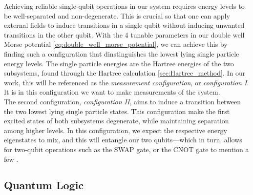 \documentclass{subfiles}
\begin{document}
Achieving reliable single-qubit operations in our system requires energy levels to be well-separated and non-degenerate. This is crucial so that one can apply external fields to induce transitions in a single qubit without inducing unwanted transitions in the other qubit. With the 4 tunable parameters in our double well Morse potential \eqref{eq:double_well_morse_potential}, we can achieve this by finding such a configuration that dinstinguishes the lowest lying single particle energy levels. The single particle energies are the Hartree energies of the two subsystems, found through the Hartree calculation \ref{sec:Hartree_method}. In our work, this will be referenced as the \emph{measurement configuration}, or \emph{configuration I}. It is in this configuration we want to make measurements of the system. 
\\ 

The second configuration, \emph{configuration II}, aims to induce a transition between the two lowest lying single particle states. This configuration make the first excited states of both subsystems degenerate, while maintaining separation among higher levels. In this configuration, we expect the respective energy eigenstates to mix, and this will entangle our two qubits—which in turn, allows for two-qubit operations such as the SWAP gate, or the CNOT gate to mention a few \cite{leinonen2024coulomb, nichol2017high}.
\subsection{Quantum Logic}
\end{document}
